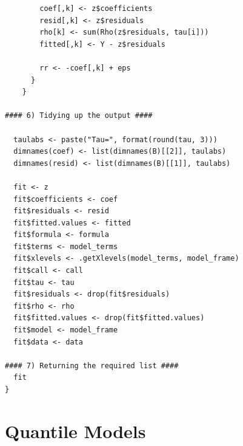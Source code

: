 \documentclass[12pt,a4paper]{report}
\begin{document}
\begin{lstlisting}
        coef[,k] <- z$coefficients
        resid[,k] <- z$residuals
        rho[k] <- sum(Rho(z$residuals, tau[i]))
        fitted[,k] <- Y - z$residuals

        rr <- -coef[,k] + eps
      }
    }

#### 6) Tidying up the output ####

  taulabs <- paste("Tau=", format(round(tau, 3)))
  dimnames(coef) <- list(dimnames(B)[[2]], taulabs)
  dimnames(resid) <- list(dimnames(B)[[1]], taulabs)

  fit <- z
  fit$coefficients <- coef
  fit$residuals <- resid
  fit$fitted.values <- fitted
  fit$formula <- formula
  fit$terms <- model_terms
  fit$xlevels <- .getXlevels(model_terms, model_frame)
  fit$call <- call
  fit$tau <- tau
  fit$residuals <- drop(fit$residuals)
  fit$rho <- rho
  fit$fitted.values <- drop(fit$fitted.values)
  fit$model <- model_frame
  fit$data <- data

#### 7) Returning the required list ####
  fit
}
\end{lstlisting}
\section{Quantile Models}\label{App:QRFunctionThyroid}
\end{document}
